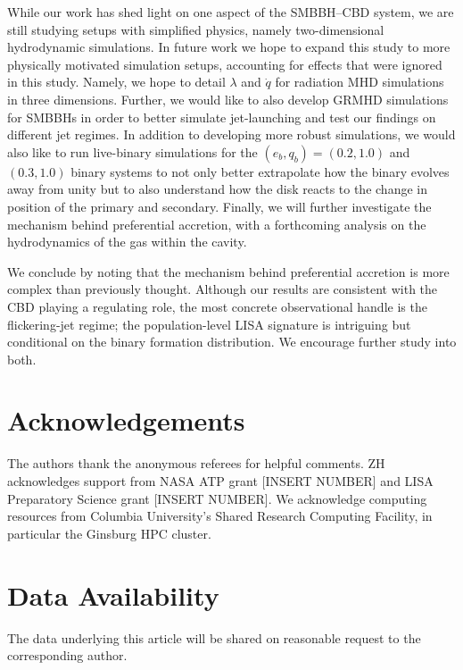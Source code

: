 \documentclass[fleqn,usenatbib]{mnras}
\begin{document}
While our work has shed light on one aspect of the SMBBH--CBD system, we are still studying setups with simplified physics, namely two-dimensional hydrodynamic simulations. In future work we hope to expand this study to more physically motivated simulation setups, accounting for effects that were ignored in this study. Namely, we hope to detail $\lambda$ and $\dot{q}$ for radiation MHD simulations in three dimensions. Further, we would like to also develop GRMHD simulations for SMBBHs in order to better simulate jet-launching and test our findings on different jet regimes. In addition to developing more robust simulations, we would also like to run live-binary simulations for the $(e_b, q_b) = (0.2, 1.0)$ and $(0.3, 1.0)$ binary systems to not only better extrapolate how the binary evolves away from unity but to also understand how the disk reacts to the change in position of the primary and secondary. Finally, we will further investigate the mechanism behind preferential accretion, with a forthcoming analysis on the hydrodynamics of the gas within the cavity.

We conclude by noting that the mechanism behind preferential accretion is more complex than previously thought. Although our results are consistent with the CBD playing a regulating role, the most concrete observational handle is the flickering-jet regime; the population-level LISA signature is intriguing but conditional on the binary formation distribution. We encourage further study into both.


\section*{Acknowledgements}
The authors thank the anonymous referees for helpful comments. ZH acknowledges support from NASA ATP grant [INSERT NUMBER] and LISA Preparatory Science grant [INSERT NUMBER]. We acknowledge computing resources from Columbia University's Shared Research Computing Facility, in particular the Ginsburg HPC cluster.

\section*{Data Availability}
The data underlying this article will be shared on reasonable request to the corresponding author.




\bsp	%
\label{lastpage}
\end{document}
